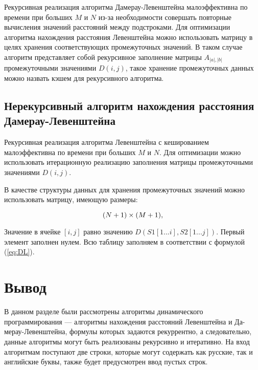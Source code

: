 Рекурсивная реализация алгоритма Дамерау-Левенштейна малоэффективна по времени при больших $M$ и $N$ из-за необходимости совершать повторные вычисления значений расстояний между подстроками.
Для оптимизации алгоритма нахождения расстояния Левенштейна можно использовать матрицу в целях хранения соответствующих промежуточных значений.
В таком случае алгоритм представляет собой рекурсивное заполнение матрицы $A_{|a|,|b|}$ промежуточными значениями $D(i,j)$, такое хранение промежуточных данных можно назвать кэшем для рекурсивного алгоритма.

\subsection{Нерекурсивный алгоритм нахождения расстояния Дамерау-Левенштейна}

Рекурсивная реализация алгоритма Левенштейна с кешированием малоэффективна по времени при больших $M$ и $N$.
Для оптимизации можно использовать итерационную реализацию заполнения матрицы промежуточными значениями $D(i,j)$.

В качестве структуры данных для хранения промежуточных значений можно использовать матрицу, имеющую  размеры:

\begin{equation}
	(N + 1)\\\times(M + 1),
\end{equation}

Значение в ячейке $[i, j]$ равно значению $D(S1[1...i], S2[1...j])$. Первый элемент заполнен нулем. Всю таблицу заполняем в соответствии с формулой (\ref{eq:DL}).

\section*{Вывод}

В данном разделе были рассмотрены алгоритмы динамического программирования --- алгоритмы нахождения расстояний Левенштейна и Да-мерау-Левенштейна, формулы которых задаются рекуррентно, а следовательно, данные алгоритмы могут быть реализованы рекурсивно и итеративно.
На вход алгоритмам поступают две строки, которые могут содержать как русские, так и английские буквы, также будет предусмотрен ввод пустых строк.
